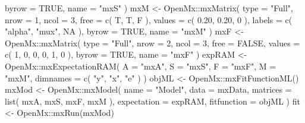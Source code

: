 \documentclass[
]{book}
\newenvironment{Shaded}{\begin{snugshade}}{\end{snugshade}}
\newcommand{\AttributeTok}[1]{\textcolor[rgb]{0.77,0.63,0.00}{#1}}
\newcommand{\ConstantTok}[1]{\textcolor[rgb]{0.00,0.00,0.00}{#1}}
\newcommand{\DecValTok}[1]{\textcolor[rgb]{0.00,0.00,0.81}{#1}}
\newcommand{\FloatTok}[1]{\textcolor[rgb]{0.00,0.00,0.81}{#1}}
\newcommand{\FunctionTok}[1]{\textcolor[rgb]{0.00,0.00,0.00}{#1}}
\newcommand{\NormalTok}[1]{#1}
\newcommand{\OtherTok}[1]{\textcolor[rgb]{0.56,0.35,0.01}{#1}}
\newcommand{\SpecialCharTok}[1]{\textcolor[rgb]{0.00,0.00,0.00}{#1}}
\newcommand{\StringTok}[1]{\textcolor[rgb]{0.31,0.60,0.02}{#1}}
\theoremstyle{definition}
\theoremstyle{definition}
\theoremstyle{definition}
\theoremstyle{remark}
\begin{document}
\begin{Shaded}
\begin{Highlighting}[]
  \AttributeTok{byrow =} \ConstantTok{TRUE}\NormalTok{,}
  \AttributeTok{name =} \StringTok{"mxS"}
\NormalTok{)}
\NormalTok{mxM }\OtherTok{\textless{}{-}}\NormalTok{ OpenMx}\SpecialCharTok{::}\FunctionTok{mxMatrix}\NormalTok{(}
  \AttributeTok{type =} \StringTok{"Full"}\NormalTok{,}
  \AttributeTok{nrow =} \DecValTok{1}\NormalTok{,}
  \AttributeTok{ncol =} \DecValTok{3}\NormalTok{,}
  \AttributeTok{free =} \FunctionTok{c}\NormalTok{(}
\NormalTok{    T, T, F}
\NormalTok{  ),}
  \AttributeTok{values =} \FunctionTok{c}\NormalTok{(}
    \FloatTok{0.20}\NormalTok{,}
    \FloatTok{0.20}\NormalTok{,}
    \DecValTok{0}
\NormalTok{  ),}
  \AttributeTok{labels =} \FunctionTok{c}\NormalTok{(}
    \StringTok{"alpha"}\NormalTok{,}
    \StringTok{"mux"}\NormalTok{,}
    \ConstantTok{NA}
\NormalTok{  ),}
  \AttributeTok{byrow =} \ConstantTok{TRUE}\NormalTok{,}
  \AttributeTok{name =} \StringTok{"mxM"}
\NormalTok{)}
\NormalTok{mxF }\OtherTok{\textless{}{-}}\NormalTok{ OpenMx}\SpecialCharTok{::}\FunctionTok{mxMatrix}\NormalTok{(}
  \AttributeTok{type =} \StringTok{"Full"}\NormalTok{,}
  \AttributeTok{nrow =} \DecValTok{2}\NormalTok{,}
  \AttributeTok{ncol =} \DecValTok{3}\NormalTok{,}
  \AttributeTok{free =} \ConstantTok{FALSE}\NormalTok{,}
  \AttributeTok{values =} \FunctionTok{c}\NormalTok{(}
    \DecValTok{1}\NormalTok{, }\DecValTok{0}\NormalTok{, }\DecValTok{0}\NormalTok{,}
    \DecValTok{0}\NormalTok{, }\DecValTok{1}\NormalTok{, }\DecValTok{0}
\NormalTok{  ),}
  \AttributeTok{byrow =} \ConstantTok{TRUE}\NormalTok{,}
  \AttributeTok{name =} \StringTok{"mxF"}
\NormalTok{)}
\NormalTok{expRAM }\OtherTok{\textless{}{-}}\NormalTok{ OpenMx}\SpecialCharTok{::}\FunctionTok{mxExpectationRAM}\NormalTok{(}
  \AttributeTok{A =} \StringTok{"mxA"}\NormalTok{,}
  \AttributeTok{S =} \StringTok{"mxS"}\NormalTok{,}
  \AttributeTok{F =} \StringTok{"mxF"}\NormalTok{,}
  \AttributeTok{M =} \StringTok{"mxM"}\NormalTok{,}
  \AttributeTok{dimnames =} \FunctionTok{c}\NormalTok{(}
    \StringTok{"y"}\NormalTok{,}
    \StringTok{"x"}\NormalTok{,}
    \StringTok{"e"}
\NormalTok{  )}
\NormalTok{)}
\NormalTok{objML }\OtherTok{\textless{}{-}}\NormalTok{ OpenMx}\SpecialCharTok{::}\FunctionTok{mxFitFunctionML}\NormalTok{()}
\NormalTok{mxMod }\OtherTok{\textless{}{-}}\NormalTok{ OpenMx}\SpecialCharTok{::}\FunctionTok{mxModel}\NormalTok{(}
  \AttributeTok{name =} \StringTok{"Model"}\NormalTok{,}
  \AttributeTok{data =}\NormalTok{ mxData,}
  \AttributeTok{matrices =} \FunctionTok{list}\NormalTok{(}
\NormalTok{    mxA,}
\NormalTok{    mxS,}
\NormalTok{    mxF,}
\NormalTok{    mxM}
\NormalTok{  ),}
  \AttributeTok{expectation =}\NormalTok{ expRAM,}
  \AttributeTok{fitfunction =}\NormalTok{ objML}
\NormalTok{)}
\NormalTok{fit }\OtherTok{\textless{}{-}}\NormalTok{ OpenMx}\SpecialCharTok{::}\FunctionTok{mxRun}\NormalTok{(mxMod)}
\end{Highlighting}
\end{Shaded}
\end{document}
